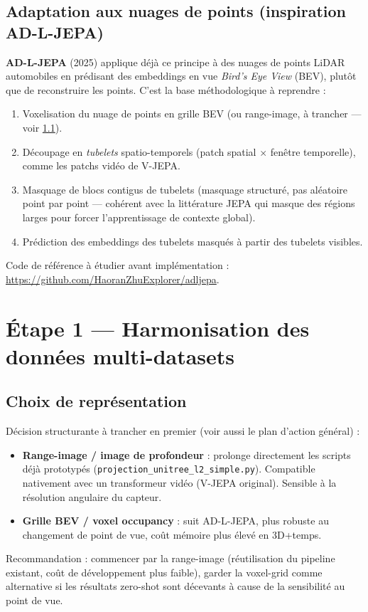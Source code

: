 \documentclass[11pt]{article}
\begin{document}
\subsection{Adaptation aux nuages de points (inspiration AD-L-JEPA)}

\textbf{AD-L-JEPA} (2025) applique déjà ce principe à des nuages de points LiDAR automobiles
en prédisant des embeddings en vue \emph{Bird's Eye View} (BEV), plutôt que de reconstruire
les points. C'est la base méthodologique à reprendre :
\begin{enumerate}
    \item Voxelisation du nuage de points en grille BEV (ou range-image, à trancher --- voir
    \ref{sec:representation}).
    \item Découpage en \emph{tubelets} spatio-temporels (patch spatial $\times$ fenêtre
    temporelle), comme les patchs vidéo de V-JEPA.
    \item Masquage de blocs contigus de tubelets (masquage structuré, pas aléatoire point par
    point --- cohérent avec la littérature JEPA qui masque des régions larges pour forcer
    l'apprentissage de contexte global).
    \item Prédiction des embeddings des tubelets masqués à partir des tubelets visibles.
\end{enumerate}
Code de référence à étudier avant implémentation : \url{https://github.com/HaoranZhuExplorer/adljepa}.

\section{Étape 1 --- Harmonisation des données multi-datasets}

\subsection{Choix de représentation}
\label{sec:representation}

Décision structurante à trancher en premier (voir aussi le plan d'action général) :
\begin{itemize}
    \item \textbf{Range-image / image de profondeur} : prolonge directement les scripts déjà
    prototypés (\texttt{projection\_unitree\_l2\_simple.py}). Compatible nativement avec un
    transformeur vidéo (V-JEPA original). Sensible à la résolution angulaire du capteur.
    \item \textbf{Grille BEV / voxel occupancy} : suit AD-L-JEPA, plus robuste au changement de
    point de vue, coût mémoire plus élevé en 3D+temps.
\end{itemize}
Recommandation : commencer par la range-image (réutilisation du pipeline existant, coût de
développement plus faible), garder la voxel-grid comme alternative si les résultats zero-shot
sont décevants à cause de la sensibilité au point de vue.
\end{document}
